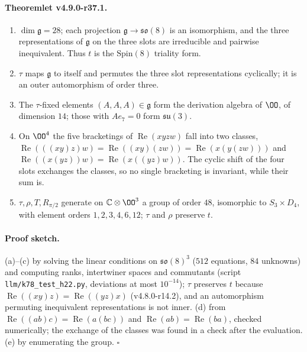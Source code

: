 \paragraph{Theoremlet v4.9.0-r37.1.}
\begin{enumerate}[leftmargin=2em]
\item[(a)] \(\dim\mathfrak g=28\); each projection \(\mathfrak g\to\mathfrak{so}(8)\) is an isomorphism, and the three representations
of \(\mathfrak g\) on the three slots are irreducible and pairwise inequivalent.  Thus \(t\) is the \(\mathrm{Spin}(8)\) triality form.
\item[(b)] \(\tau\) maps \(\mathfrak g\) to itself and permutes the three slot representations cyclically; it is an outer
automorphism of order three.
\item[(c)] The \(\tau\)-fixed elements \((A,A,A)\in\mathfrak g\) form the derivation algebra of \(\OO\), of dimension \(14\); those
with \(Ae_7=0\) form \(\mathfrak{su}(3)\).
\item[(d)] On \(\OO^4\) the five bracketings of \(\operatorname{Re}(xyzw)\) fall into two classes,
\(\operatorname{Re}(((xy)z)w)=\operatorname{Re}((xy)(zw))=\operatorname{Re}(x(y(zw)))\) and
\(\operatorname{Re}((x(yz))w)=\operatorname{Re}(x((yz)w))\).  The cyclic shift of the four slots exchanges the classes, so no single
bracketing is invariant, while their sum is.
\item[(e)] \(\tau,\rho,T,R_{\pi/2}\) generate on \(\mathbb C\otimes\OO^3\) a group of order \(48\), isomorphic to \(S_3\times D_4\), with
element orders \(1,2,3,4,6,12\); \(\tau\) and \(\rho\) preserve \(t\).
\end{enumerate}

\paragraph{Proof sketch.}
(a)--(c) by solving the linear conditions on \(\mathfrak{so}(8)^3\) (\(512\) equations, \(84\) unknowns) and computing ranks,
intertwiner spaces and commutants (script \texttt{llm/k78\_test\_h22.py}, deviations at most \(10^{-14}\)); \(\tau\) preserves \(t\)
because \(\operatorname{Re}((xy)z)=\operatorname{Re}((yz)x)\) (v4.8.0-r14.2), and an automorphism permuting inequivalent
representations is not inner.  (d) from \(\operatorname{Re}((ab)c)=\operatorname{Re}(a(bc))\) and \(\operatorname{Re}(ab)=\operatorname{Re}(ba)\),
checked numerically; the exchange of the classes was found in a check after the evaluation.  (e) by enumerating the group.
\(\square\)

